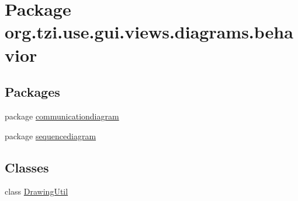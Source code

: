 \hypertarget{namespaceorg_1_1tzi_1_1use_1_1gui_1_1views_1_1diagrams_1_1behavior}{\section{Package org.\-tzi.\-use.\-gui.\-views.\-diagrams.\-behavior}
\label{namespaceorg_1_1tzi_1_1use_1_1gui_1_1views_1_1diagrams_1_1behavior}
}
\subsection*{Packages}
\begin{DoxyCompactItemize}
\item 
package \hyperlink{namespaceorg_1_1tzi_1_1use_1_1gui_1_1views_1_1diagrams_1_1behavior_1_1communicationdiagram}{communicationdiagram}
\item 
package \hyperlink{namespaceorg_1_1tzi_1_1use_1_1gui_1_1views_1_1diagrams_1_1behavior_1_1sequencediagram}{sequencediagram}
\end{DoxyCompactItemize}
\subsection*{Classes}
\begin{DoxyCompactItemize}
\item 
class \hyperlink{classorg_1_1tzi_1_1use_1_1gui_1_1views_1_1diagrams_1_1behavior_1_1_drawing_util}{Drawing\-Util}
\end{DoxyCompactItemize}
